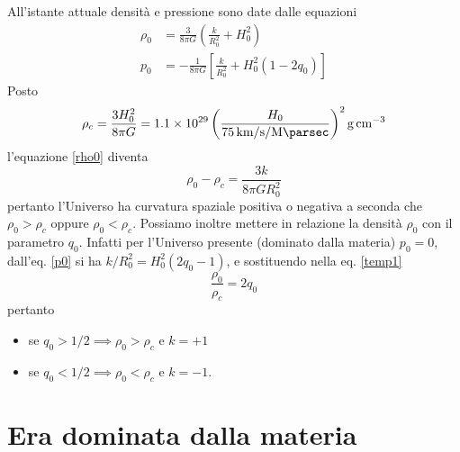 All'istante attuale densità e pressione sono date dalle equazioni
\begin{subequations}
  \begin{align}
    \rho_0  &= \frac{3}{8 \pi G} \left(\frac{k}{R_0^2} + H_0^2 \right)
    \label{rho0} \\
    p_0 &= -\frac{1}{8 \pi G} \left[\frac {k}{R_0^2}+H_0^2(1-2q_0)\right]
    \label{p0}
  \end{align}
\end{subequations}
Posto
\begin{equation}
  \rho_c = \frac{3 H_0^2}{8 \pi G} = \num{1.1e29}
  \left(
    \frac{H_0}{\SI[per-mode=reciprocal]{75}{\kilo\metre \per \second \per
        \mega\parsec}}
  \right)^2
  \si{\gram\per\centi\metre\cubed}
  \label{rhoc}
\end{equation}
l'equazione \eqref{rho0} diventa
\begin{equation}
  \rho_0-\rho_c =  \frac{3 k}{8 \pi G R_0^2}
  \label{temp1}
\end{equation}
pertanto l'Universo ha curvatura spaziale positiva o negativa a seconda che
$\rho_0 > \rho_c$ oppure $\rho_0 < \rho_c$.  Possiamo inoltre mettere in
relazione la densità $\rho_0$ con il parametro $q_0$.  Infatti per l'Universo
presente (dominato dalla materia) $p_0=0$, dall'eq. \eqref{p0} si ha
$k/R_0^2 = H_0^2 (2q_0-1)$, e sostituendo nella eq. \eqref{temp1}
\begin{equation}
  \frac {\rho_0} {\rho_c}=2 q_0
  \label{rho0surhoc}
\end{equation}
pertanto
\begin{itemize}
\item se $q_0 > 1/2 \implies \rho_0>\rho_c$ e $k=+1$
\item se $q_0 < 1/2 \implies \rho_0<\rho_c$ e $k=-1$.
\end{itemize}

\section{Era dominata dalla materia}


